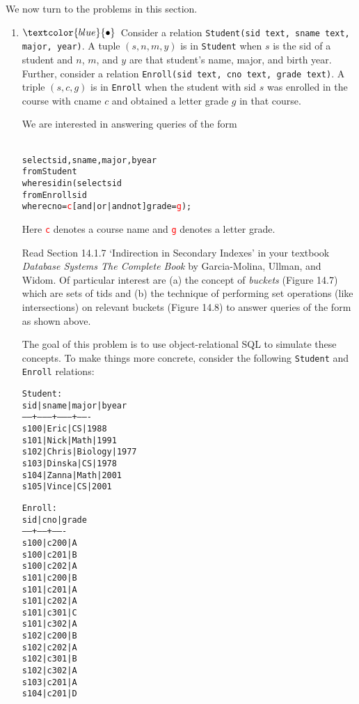 \documentclass{article}
\newcommand{\bluebullet}{$\textcolor{blue}{\bullet}$}
\newcommand{\red}[1]{\textcolor{red}#1}
\newcommand{\blue}[1]{{\color{blue}#1}}
\begin{document}
We now turn to the problems in this section.

\begin{enumerate}[resume]
\item\label{secondaryIndexes}\bluebullet\ Consider a relation {\tt Student(sid text, sname text, major, year)}.   A tuple
$(s, n, m, y)$ is in {\tt Student} when $s$ is the sid of a student and $n$, $m$, and $y$ are that
student's name, major, and birth year.  Further,
consider a relation {\tt Enroll(sid text, cno text, grade text)}.   A triple $(s, c, g)$ is in {\tt Enroll} when the student with sid $s$ was enrolled in the course with cname $c$ and obtained a letter grade $g$ in that course. 

We are interested in answering queries of the form
{\footnotesize
\begin{alltt}{\blue{
select sid, sname, major, byear 
from   Student 
where  sid in (select sid
               from   Enroll sid
               where  cno = \red{c} [and|or|and not] grade = \red{g});}}
\end{alltt}  
}
Here \textcolor{red}{\tt c} denotes a course name and \textcolor{red}{\tt g} denotes a letter grade.

Read Section 14.1.7 `Indirection in Secondary Indexes' in your textbook \emph{Database Systems The Complete Book} by Garcia-Molina, Ullman, and Widom.   Of particular interest are (a) the concept of \emph{buckets} (Figure 14.7) which are sets of tids and (b)
the technique of performing set operations (like intersections) on relevant buckets (Figure 14.8) to answer queries of the form as shown above.

The goal of this problem is to use object-relational SQL to simulate these concepts. To make things more concrete, consider the following {\tt Student} and {\tt Enroll} relations:


\begin{center}
{\footnotesize
\begin{alltt}
Student:
 sid  | sname  |  major  | byear 
------+--------+---------+-------
 s100 | Eric   | CS      |  1988
 s101 | Nick   | Math    |  1991
 s102 | Chris  | Biology |  1977
 s103 | Dinska | CS      |  1978
 s104 | Zanna  | Math    |  2001
 s105 | Vince  | CS      |  2001
\end{alltt}
}
\end{center}

\begin{center}
{\footnotesize
\begin{alltt}
Enroll:
 sid  | cno  | grade 
------+------+-------
 s100 | c200 | A
 s100 | c201 | B
 s100 | c202 | A
 s101 | c200 | B
 s101 | c201 | A
 s101 | c202 | A
 s101 | c301 | C
 s101 | c302 | A
 s102 | c200 | B
 s102 | c202 | A
 s102 | c301 | B
 s102 | c302 | A
 s103 | c201 | A
 s104 | c201 | D
\end{alltt}
}
\end{center}


\end{enumerate}
\end{document}
